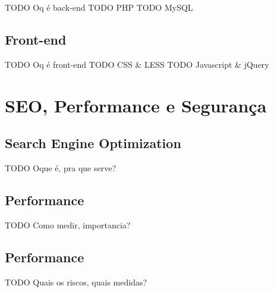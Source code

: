 TODO Oq é back-end
TODO PHP
TODO MySQL

\subsection{Front-end}

TODO Oq é front-end
TODO CSS & LESS
TODO Javascript & jQuery

\section{SEO, Performance e Segurança}

\subsection{Search Engine Optimization}

TODO Oque é, pra que serve?

\subsection{Performance}

TODO Como medir, importancia?

\subsection{Performance}

TODO Quais os riscos, quais medidas?

